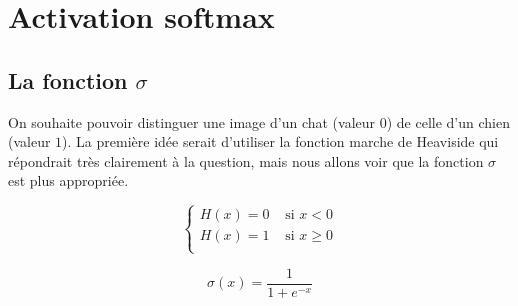 \documentclass[11pt,class=report,crop=false]{standalone}
\begin{document}







\section{Activation softmax}


\subsection{La fonction $\sigma$}

On souhaite pouvoir distinguer une image d'un chat (valeur $0$) de celle d'un chien (valeur $1$). La première idée serait d'utiliser la fonction marche de Heaviside qui répondrait très clairement à la question, mais nous allons voir que la fonction $\sigma$ est plus appropriée.

\begin{minipage}{0.45\textwidth}
\begin{center}
\end{center}
$$\begin{cases}
H(x) = 0 & \text{ si } x < 0 \\
H(x) = 1  & \text{ si } x \ge 0 \\
\end{cases}$$

\end{minipage}
\qquad
\begin{minipage}{0.5\textwidth}
\begin{center}
\end{center}
$$\sigma(x) = \frac{1}{1+e^{-x}}$$
\end{minipage}
\end{document}
